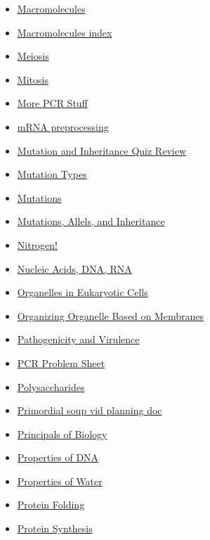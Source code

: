 \documentclass[11pt]{article}
\begin{document}
\begin{itemize}
\begin{itemize}
\begin{itemize}
\item \href{biology/bio10/KBMacromelecules.org}{Macromolecules}
\item \href{biology/bio10/KBe2020bio101refMacromolecules.org}{Macromolecules index}
\item \href{biology/bio10/KBhBIO101Meiosis.org}{Meiosis}
\item \href{biology/bio10/KBhBIO101Mitosis.org}{Mitosis}
\item \href{biology/bio10/KBhBIO101MorePCRStuff.org}{More PCR Stuff}
\item \href{biology/bio10/KBhBIO101mRNAPreprocessing.org}{mRNA preprocessing}
\item \href{biology/bio10/KBhBIO101MutationInheritanceQuizReview.org}{Mutation and Inheritance Quiz Review}
\item \href{biology/bio10/KBrefMutationTypes.org}{Mutation Types}
\item \href{biology/bio10/KBhBIO101Mutations.org}{Mutations}
\item \href{biology/bio10/KBhBIO101MutationsAllealsInheritance.org}{Mutations, Allels, and Inheritance}
\item \href{biology/bio10/KBNitrogen.org}{Nitrogen!}
\item \href{biology/bio10/KBhBIO101NucleicAcidsDNARNA.org}{Nucleic Acids, DNA, RNA}
\item \href{biology/bio10/KBhBIO101EukaryoticOrganells.org}{Organelles in Eukaryotic Cells}
\item \href{biology/bio10/KBhBIO101OrganellsBasedOnMembranes.org}{Organizing Organelle Based on Membranes}
\item \href{biology/bio10/KBhBIO101PathogenicityandVirulence.org}{Pathogenicity and Virulence}
\item \href{biology/bio10/KBxPCRcont.org}{PCR Problem Sheet}
\item \href{biology/bio10/KBe2020bio101floPolysaccharides.org}{Polysaccharides}
\item \href{biology/bio10/KBBioPrimoridalSoupPlanning.org}{Primordial soup vid planning doc}
\item \href{biology/bio10/KBhBIO101PrinciplesofBio.org}{Principals of Biology}
\item \href{biology/bio10/KBrefPropertiesOfDNA.org}{Properties of DNA}
\item \href{biology/bio10/KBhBIO101PropsOfWater.org}{Properties of Water}
\item \href{biology/bio10/KBe2020bio101refProteinFolding.org}{Protein Folding}
\item \href{biology/bio10/KBhBIO101ProteinSynthesis.org}{Protein Synthesis}

\end{itemize}
\end{itemize}
\end{itemize}
\end{document}
